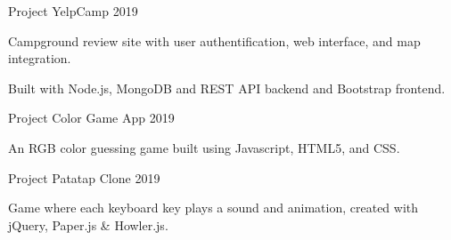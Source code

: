 


\begin{cventries}

\cventry
{Project} %
{YelpCamp} %
{} %
{2019} %
{ %
\begin{cvitems}
    \item{ Campground review site with user authentification, web interface, and map integration.}
    \item{ Built with Node.js, MongoDB and REST API backend and Bootstrap frontend.\\}
\end{cvitems}
}

\cventry
{Project} %
{Color Game App} %
{} %
{2019} %
{ %
\begin{cvitems}
\item{An RGB color guessing game built using Javascript, HTML5, and CSS.\\}
\end{cvitems}
}

\cventry
{Project} %
{Patatap Clone} %
{} %
{2019} %
{ %
\begin{cvitems}
\item{Game where each keyboard key plays a sound and animation, created with jQuery, Paper.js \& Howler.js.\\}
\end{cvitems}
}


\end{cventries}
